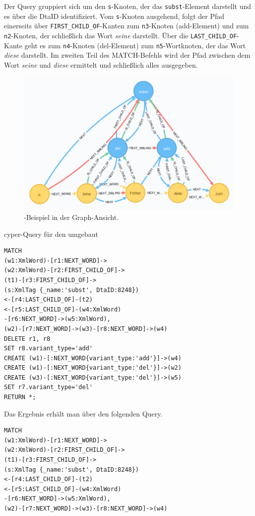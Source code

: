 Der Query gruppiert sich um den \texttt{s}-Knoten, der das
\texttt{subst}-Element darstellt und es über die DtaID identifiziert.
Vom \texttt{s}-Knoten ausgehend, folgt der Pfad einerseits über
\texttt{FIRST\_CHILD\_OF}-Kanten zum \texttt{n3}-Knoten (add-Element)
und zum \texttt{n2}-Knoten, der schließlich das Wort \emph{seine}
darstellt. Über die \texttt{LAST\_CHILD\_OF}-Kante geht es zum
\texttt{n4}-Knoten (del-Element) zum \texttt{n5}-Wortknoten, der das
Wort \emph{diese} darstellt. Im zweiten Teil des MATCH-Befehls wird der
Pfad zwischen dem Wort \emph{seine} und \emph{diese} ermittelt und
schließlich alles ausgegeben.

\begin{figure}
\centering
\includegraphics{Bilder/TEI2Graph/subst-graph-1.png}
\caption{-Beispiel in der Graph-Ansicht.}
\end{figure}

cyper-Query für den umgebaut

\begin{verbatim}
MATCH
(w1:XmlWord)-[r1:NEXT_WORD]->
(w2:XmlWord)-[r2:FIRST_CHILD_OF]->
(t1)-[r3:FIRST_CHILD_OF]->
(s:XmlTag {_name:'subst', DtaID:8248})
<-[r4:LAST_CHILD_OF]-(t2)
<-[r5:LAST_CHILD_OF]-(w4:XmlWord)
-[r6:NEXT_WORD]->(w5:XmlWord),
(w2)-[r7:NEXT_WORD]->(w3)-[r8:NEXT_WORD]->(w4)
DELETE r1, r8
SET r8.variant_type='add'
CREATE (w1)-[:NEXT_WORD{variant_type:'add'}]->(w4)
CREATE (w1)-[:NEXT_WORD{variant_type:'del'}]->(w2)
CREATE (w3)-[:NEXT_WORD{variant_type:'del'}]->(w5)
SET r7.variant_type='del'
RETURN *;
\end{verbatim}

Das Ergebnis erhält man über den folgenden Query.

\begin{verbatim}
MATCH
(w1:XmlWord)-[r1:NEXT_WORD]->
(w2:XmlWord)-[r2:FIRST_CHILD_OF]->
(t1)-[r3:FIRST_CHILD_OF]->
(s:XmlTag {_name:'subst', DtaID:8248})
<-[r4:LAST_CHILD_OF]-(t2)
<-[r5:LAST_CHILD_OF]-(w4:XmlWord)
-[r6:NEXT_WORD]->(w5:XmlWord),
(w2)-[r7:NEXT_WORD]->(w3)-[r8:NEXT_WORD]->(w4)
\end{verbatim}

